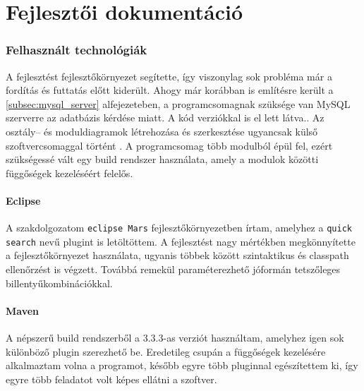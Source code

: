 \part{Fejlesztői dokumentáció}


\section{Felhasznált technológiák}
A fejlesztést fejlesztőkörnyezet segítette, így viszonylag sok probléma már a fordítás és futtatás előtt kiderült. Ahogy már korábban is említésre került a \ref{subsec:mysql_server} alfejezeteben, a programcsomagnak szüksége van MySQL szerverre az adatbázis kérdése miatt. A kód verziókkal is el lett látva.. Az osztály-- és moduldiagramok létrehozása és szerkesztése ugyancsak külső szoftvercsomaggal történt . A programcsomag több modulból épül fel, ezért szükségessé vált egy build rendszer használata, amely a modulok közötti függőségek kezeléséért felelős.

\subsection{Eclipse}
A szakdolgozatom \texttt{eclipse Mars} \cite{eclipse_mars} fejlesztőkörnyezetben írtam, amelyhez a \texttt{quick search} \cite{quick_search} nevű plugint is letöltöttem. A fejlesztést nagy mértékben megkönnyítette a fejlesztőkörnyezet használata, ugyanis többek között szintaktikus és classpath ellenőrzést is végzett. Továbbá remekül paraméterezhető jóformán tetszőleges billentyűkombinációkkal.

\subsection{Maven}
A népszerű build rendszerből a 3.3.3-as verziót használtam, amelyhez igen sok különböző plugin szerezhető be. Eredetileg csupán a függőségek kezelésére alkalmaztam volna a programot, később egyre több pluginnal egészítettem ki, így egyre több feladatot volt képes ellátni a szoftver.


